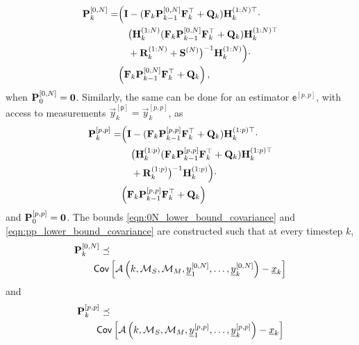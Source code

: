 \documentclass[conference]{IEEEtran}
\theoremstyle{definition}
\theoremstyle{remark}
\begin{document}
\begin{equation}\label{eqn:0N_lower_bound_covariance}
  \begin{split}
    \mat{P}_k^{[0,N]} =& \Bigl( \mat{I} - (\mat{F}_k\mat{P}_{k-1}^{[0,N]}\mat{F}_k^\top + \mat{Q}_k)\mat{H}_k^{(1:N)\top} \cdot \\
    &\quad\bigl(\mat{H}_k^{(1:N)}(\mat{F}_k\mat{P}_{k-1}^{[0,N]}\mat{F}_k^\top + \mat{Q}_k)\mat{H}_k^{(1:N)\top} \\
    &\quad+ \mat{R}_k^{(1:N)} + \mat{S}^{(N)}\bigr)^{-1}\mat{H}_k^{(1:N)}\Bigr)\cdot\\
    &\Bigl(\mat{F}_k\mat{P}_{k-1}^{[0,N]}\mat{F}_k^\top + \mat{Q}_k\Bigr)\,,
 \end{split}
\end{equation}
when ${{\mathbf{P}}}_0^{[0,N]}={{\mathbf{0}}}$. Similarly, the same can be done for an estimator $\mathsf{e}^{[p,p]}$, with access to measurements $\vec{y}_k^{[\mathsf{p}]}=\vec{y}_k^{[p,p]}$, as
\begin{equation}\label{eqn:pp_lower_bound_covariance}
  \begin{split}
    \mat{P}_k^{[p,p]} =& \Bigl( \mat{I} - (\mat{F}_k\mat{P}_{k-1}^{[p,p]}\mat{F}_k^\top + \mat{Q}_k)\mat{H}_k^{(1:p)\top} \cdot \\
    &\quad\bigl(\mat{H}_k^{(1:p)}(\mat{F}_k\mat{P}_{k-1}^{[p,p]}\mat{F}_k^\top + \mat{Q}_k)\mat{H}_k^{(1:p)\top} \\
    &\quad+ \mat{R}_k^{(1:p)}\bigr)^{-1}\mat{H}_k^{(1:p)}\Bigr)\cdot\\
    &\Bigl(\mat{F}_k\mat{P}_{k-1}^{[p,p]}\mat{F}_k^\top + \mat{Q}_k\Bigr)
  \end{split}
\end{equation}
and ${{\mathbf{P}}}_0^{[p,p]}={{\mathbf{0}}}$. The bounds \eqref{eqn:0N_lower_bound_covariance} and \eqref{eqn:pp_lower_bound_covariance} are constructed such that at every timestep $k$,
\begin{equation}\label{eqn:0N_cov_bound}
  \begin{split}
    &\mat{P}_k^{[0,N]} \preceq\\
    &\qquad \mathsf{Cov}\left[\mathcal{A}\left(k,\mathcal{M}_S,\mathcal{M}_M,\vec{y}_1^{[0,N]},\dots,\vec{y}_k^{[0,N]}\right) - \vec{x}_k\right]
  \end{split}
\end{equation}
and
\begin{equation}\label{eqn:pp_cov_bound}
  \begin{split}
    &\mat{P}_k^{[p,p]} \preceq\\
    &\qquad \mathsf{Cov}\left[\mathcal{A}\left(k,\mathcal{M}_S,\mathcal{M}_M,\vec{y}_1^{[p,p]},\dots,\vec{y}_k^{[p,p]}\right) - \vec{x}_k\right]
  \end{split}
\end{equation}
\end{document}
